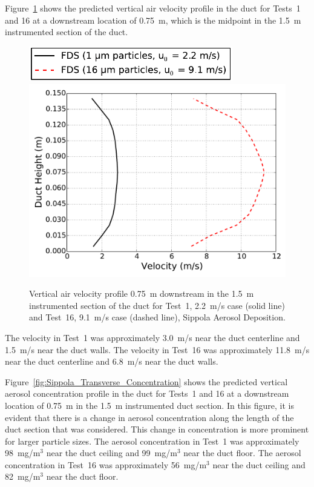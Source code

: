 \noindent Figure~\ref{fig:Sippola_Transverse_Velocity} shows the predicted vertical air velocity profile in the duct for Tests~1 and 16 at a downstream location of 0.75~m, which is the midpoint in the 1.5~m instrumented section of the duct.

\begin{figure}[!ht]
\includegraphics[width=3.5in]{Fig_Sippola_Aerosol_Deposition_Transverse_Legend.pdf}
\includegraphics[width=5.0in]{Fig_Sippola_Aerosol_Deposition_Transverse_Velocity.pdf}
\caption[Vertical air velocity profile, Sippola Aerosol Deposition]
{Vertical air velocity profile 0.75~m downstream in the 1.5~m instrumented section of the duct for Test~1, 2.2~m/s case (solid line) and Test~16, 9.1~m/s case (dashed line), Sippola Aerosol Deposition.}
\label{fig:Sippola_Transverse_Velocity}
\end{figure}

The velocity in Test~1 was approximately 3.0~m/s near the duct centerline and 1.5~m/s near the duct walls. The velocity in Test~16 was approximately 11.8~m/s near the duct centerline and 6.8~m/s near the duct walls.

\noindent Figure~\ref{fig:Sippola_Transverse_Concentration} shows the predicted vertical aerosol concentration profile in the duct for Tests~1 and 16 at a downstream location of 0.75~m in the 1.5~m instrumented duct section. In this figure, it is evident that there is a change in aerosol concentration along the length of the duct section that was considered. This change in concentration is more prominent for larger particle sizes. The aerosol concentration in Test~1 was approximately 98~mg/m$^3$ near the duct ceiling and 99~mg/m$^3$ near the duct floor. The aerosol concentration in Test~16 was approximately 56~mg/m$^3$ near the duct ceiling and 82~mg/m$^3$ near the duct floor.

